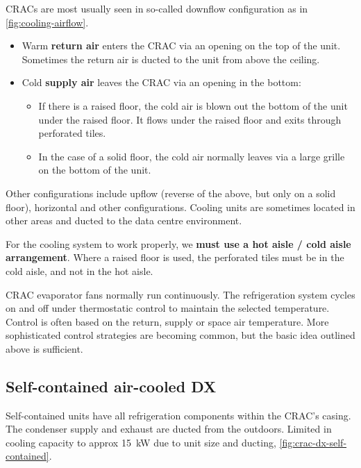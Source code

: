 \documentclass{pgnotes}
\begin{document}
CRACs are most usually seen in so-called downflow configuration as in \autoref{fig:cooling-airflow}.
\begin{itemize}
\item Warm \textbf{return air} enters the CRAC via an opening on the top of the unit.
  Sometimes the return air is ducted to the unit from above the ceiling.
\item Cold \textbf{supply air} leaves the CRAC via an opening in the bottom:
  \begin{itemize}
  \item If there is a raised floor, the cold air is blown out the bottom of the unit under the raised floor.
    It flows under the raised floor and exits through perforated tiles.
  \item In the case of a solid floor, the cold air normally leaves via a large grille on the bottom of the unit.
  \end{itemize}
\end{itemize}
Other configurations include upflow (reverse of the above, but only on a solid floor), horizontal and other configurations.
Cooling units are sometimes located in other areas and ducted to the data centre environment.

For the cooling system to work properly, we \textbf{must use a hot aisle / cold aisle arrangement}.
Where a raised floor is used, the perforated tiles must be in the cold aisle, and not in the hot aisle.

CRAC evaporator fans normally run continuously.
The refrigeration system cycles on and off under thermostatic control to maintain the selected temperature.
Control is often based on the return, supply or space air temperature.
More sophisticated control strategies are becoming common, but the basic idea outlined above is sufficient.

\newpage

\subsection{Self-contained air-cooled DX}

Self-contained units have all refrigeration components within the CRAC's casing.
The condenser supply and exhaust are ducted from the outdoors.
Limited in cooling capacity to approx \SI{15}{\kilo\watt} due to unit size and ducting, \autoref{fig:crac-dx-self-contained}.
\end{document}
